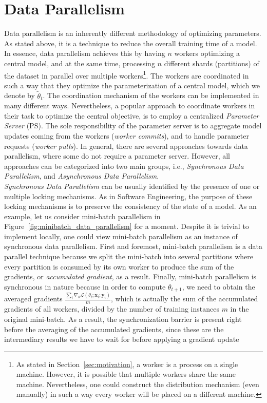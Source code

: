 \section{Data Parallelism}
\label{sec:intro_data_parallelism}

Data parallelism is an inherently different methodology of optimizing parameters. As stated above, it is a technique to reduce the overall training time of a model. In essence, data parallelism achieves this by having $n$ workers optimizing a central model, and at the same time, processing $n$ different shards (partitions) of the dataset in parallel over multiple workers\footnote{As stated in Section~\ref{sec:motivation}, a worker is a process on a single machine. However, it is possible that multiple workers share the same machine. Nevertheless, one could construct the distribution mechanism (even manually) in such a way every worker will be placed on a different machine.}. The workers are coordinated in such a way that they optimize the parameterization of a central model, which we denote by $\tilde{\theta}_t$. The coordination mechanism of the workers can be implemented in many different ways. Nevertheless, a popular approach to coordinate workers in their task to optimize the central objective, is to employ a centralized \emph{Parameter Server} (PS). The sole responsibility of the parameter server is to aggregate model updates coming from the workers (\emph{worker commits}), and to handle parameter requests (\emph{worker pulls}). In general, there are several approaches towards data parallelism, where some do not require a parameter server. However, all approaches can be categorized into two main groups, i.e., \emph{Synchronous Data Parallelism}, and \emph{Asynchronous Data Parallelism}.\\

\emph{Synchronous Data Parallelism} can be usually identified by the presence of one or multiple locking mechanisms. As in Software Engineering, the purpose of these locking mechanisms is to preserve the consistency of the state of a model. As an example, let us consider mini-batch parallelism in Figure~\ref{fig:minibatch_data_parallelism} for a moment. Despite it is trivial to implement locally, one could view mini-batch parallelism as an instance of synchronous data parallelism. First and foremost, mini-batch parallelism is a data parallel technique because we split the mini-batch into several partitions where every partition is consumed by its own worker to produce the sum of the gradients, or \emph{accumulated gradient}, as a result. Finally, mini-batch parallelism is synchronous in nature because in order to compute $\theta_{t+1}$, we need to obtain the averaged gradients $\frac{\sum_i \nabla_\theta \mathcal{L}(\theta_t;\textbf{x}_i;\textbf{y}_i)}{m}$, which is actually the sum of the accumulated gradients of all workers, divided by the number of training instances $m$ in the original mini-batch. As a result, the synchronization barrier is present right before the averaging of the accumulated gradients, since these are the intermediary results we have to wait for before applying a gradient update

